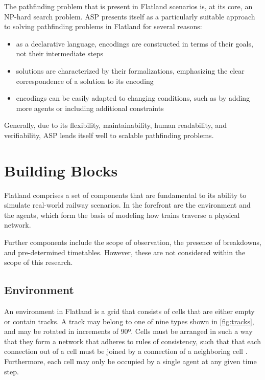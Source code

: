 \documentclass[11pt]{article}
\begin{document}

The pathfinding problem that is present in Flatland scenarios is, at its core, an NP-hard search problem.  ASP presents itself as a particularly suitable approach to solving pathfinding problems in Flatland for several reasons:
\begin{itemize}
	\item as a declarative language, encodings are constructed in terms of their goals, not their intermediate steps
	\item solutions are characterized by their formalizations, emphasizing the clear correspondence of a solution to its encoding
	\item encodings can be easily adapted to changing conditions, such as by adding more agents or including additional constraints
\end{itemize}

\noindent Generally, due to its flexibility, maintainability, human readability, and verifiability, ASP lends itself well to scalable pathfinding problems. \medskip


\section{Building Blocks}
Flatland comprises a set of components that are fundamental to its ability to simulate real-world railway scenarios.  In the forefront are the environment and the agents, which form the basis of modeling how trains traverse a physical network.

Further components include the scope of observation, the presence of breakdowns, and pre-determined timetables.  However, these are not considered within the scope of this research.

\subsection{Environment}
\label{sec:Environment}
An environment in Flatland is a grid that consists of cells that are either empty or contain tracks.  A track may belong to one of nine types shown in \autoref{fig:tracks}, and may be rotated in increments of 90º.  Cells must be arranged in such a way that they form a network that adheres to rules of consistency, such that that each connection out of a cell must be joined by a connection of a neighboring cell \citep{baeiegljmomonyspwaaggo21a}.  Furthermore, each cell may only be occupied by a single agent at any given time step.
\end{document}
